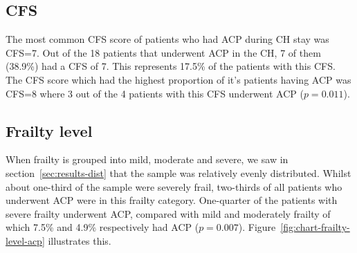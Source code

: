 \documentclass
[
	12pt,
	a4paper,
	oneside,
]{report}
\begin{document}
\subsection{CFS}

The most common CFS score of patients 
who had ACP during CH stay was CFS=7. Out of the 18 patients that
underwent ACP in the CH, 7 of them (38.9\%) had a CFS of 7. This represents 
17.5\% of the patients with this CFS. The CFS score which had the highest 
proportion of it's patients having ACP was CFS=8 where 3 out of the 4 patients 
with this CFS underwent ACP ($p=0.011$). 


\subsection{Frailty level}

When frailty is grouped into mild, moderate and severe, we saw in 
section~\ref{sec:results-dist} that the
sample was relatively evenly distributed. 
Whilst about one-third of the sample were severely frail, two-thirds of all 
patients who underwent ACP were in this frailty category. One-quarter of
the patients with severe frailty underwent ACP, compared with mild and moderately
frailty of which 7.5\% and 4.9\% respectively had ACP ($p=0.007$).
Figure~\ref{fig:chart-frailty-level-acp} illustrates this.
\end{document}
